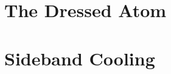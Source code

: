 \documentclass[10pt,fleqn]{article}
\begin{document}
\section{The Dressed Atom}
\subsection{}
\subsection{}
\subsection{}
\subsection{}
\subsection{}
\subsection{}

\section{Sideband Cooling}
\end{document}
